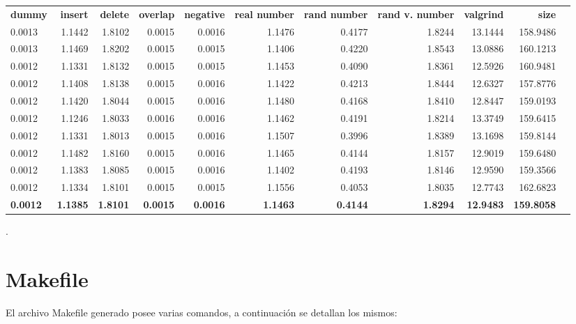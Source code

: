 \documentclass[a4paper, 12pt]{article}
\begin{document}
\begin{adjustwidth}{-2.5 cm}{-2.5 cm}\centering\begin{threeparttable}[!htb]
\caption{PC 2 (en segundos)}\label{tab: }
\scriptsize
\begin{tabular}{lrrrrrrrrrr}\toprule
\textbf{dummy} &\textbf{insert} &\textbf{delete} &\textbf{overlap} &\textbf{negative} &\textbf{real number} &\textbf{rand number} &\textbf{rand v. number} &\textbf{valgrind} &\textbf{size} \\\cmidrule{1-10}
0.0013 &1.1442 &1.8102 &0.0015 &0.0016 &1.1476 &0.4177 &1.8244 &13.1444 &158.9486 \\\cmidrule{1-10}
0.0013 &1.1469 &1.8202 &0.0015 &0.0015 &1.1406 &0.4220 &1.8543 &13.0886 &160.1213 \\\cmidrule{1-10}
0.0012 &1.1331 &1.8132 &0.0015 &0.0015 &1.1453 &0.4090 &1.8361 &12.5926 &160.9481 \\\cmidrule{1-10}
0.0012 &1.1408 &1.8138 &0.0015 &0.0016 &1.1422 &0.4213 &1.8444 &12.6327 &157.8776 \\\cmidrule{1-10}
0.0012 &1.1420 &1.8044 &0.0015 &0.0016 &1.1480 &0.4168 &1.8410 &12.8447 &159.0193 \\\cmidrule{1-10}
0.0012 &1.1246 &1.8033 &0.0016 &0.0016 &1.1462 &0.4191 &1.8214 &13.3749 &159.6415 \\\cmidrule{1-10}
0.0012 &1.1331 &1.8013 &0.0015 &0.0016 &1.1507 &0.3996 &1.8389 &13.1698 &159.8144 \\\cmidrule{1-10}
0.0012 &1.1482 &1.8160 &0.0015 &0.0016 &1.1465 &0.4144 &1.8157 &12.9019 &159.6480 \\\cmidrule{1-10}
0.0012 &1.1383 &1.8085 &0.0015 &0.0016 &1.1402 &0.4193 &1.8146 &12.9590 &159.3566 \\\midrule
0.0012 &1.1334 &1.8101 &0.0015 &0.0015 &1.1556 &0.4053 &1.8035 &12.7743 &162.6823 \\
\textbf{0.0012} &\textbf{1.1385} &\textbf{1.8101} &\textbf{0.0015} &\textbf{0.0016} &\textbf{1.1463} &\textbf{0.4144} &\textbf{1.8294} &\textbf{12.9483} &\textbf{159.8058}  \\
\bottomrule
\end{tabular}
.\end{threeparttable}\end{adjustwidth}
\newpage
\section{Makefile}
	El archivo Makefile generado posee varias comandos, a continuación se detallan los mismos:
    
\end{document}
